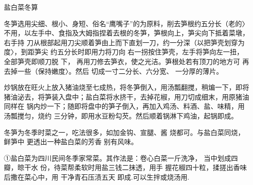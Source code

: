 \begin{recipe}{盐白菜冬算}

\ingredients


\preparation

\step 冬笋选用尖细、根小、身短、俗名“鹰嘴子”的为原料，削去笋根约五分长（老的〉
不用，以左手中、食指及大姆指捏着去根的冬笋，笋根向上，笋尖向下抵着菜墩，右手持
刀从根部起用刀尖顺着笋由上而下直划一刀，约一分深（以把笋壳划穿为度〉，到距笋尖
约五分长时即用力将刀向 右一拐按住笋壳，左手将笋向左一扭，全部笋壳即顺刀脱 下，
再用刀修去笋衣，使之光洁。笋根处若有顶刀的地方可 再去掉一些（保持嫩度〉。然后
切成一寸二分长、六分宽、 一分厚的薄片。

\step 炒锅放在旺火上放入猪油烧至七成热，将冬笋倒入，用汤瓢翻搅，稍煸一下，即将
猪油泌去，将笋装入盘中；盐白菜将水挤干，去掉花椒，用刀切成细末，用原猪油同样在
锅内炒一下；随即将盘中的笋子倒入，再加入鸡汤、料酒、盐、味精，用汤瓢搅匀，烧约
三分钟，即用水豆粉勾芡。然后顺着锅淋下鸡油，起锅即成。

\features

冬笋为冬季时菜之一，吃法很多，如加金钩、宣腿、酱 烧都可。与盐白菜同烧，鲜笋中
更透出一种盐白菜的芳香 别有风味。

①盐白菜为四川民间冬季家常菜。其作法是：卷心白菜一斤洗净， 当中划成四瓣，晾干水
份，待菜帮柔软时用盐三钱二抹透，用手 握花椒四十粒，揉搓出香味后撒在菜心中，用
干净青石压渍五天 即成.可以生拌或烧汤用.

\end{recipe}

